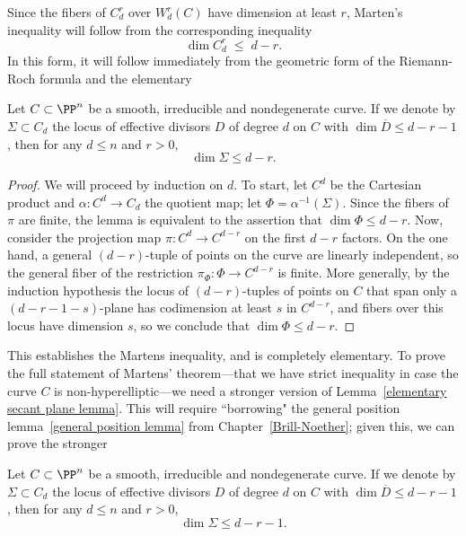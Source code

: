 Since the fibers of $C^r_d$ over $W^r_d(C)$ have dimension at least $r$, Marten's inequality will follow from the corresponding inequality
$$
\dim C^r_d \; \leq \; d-r.
$$
In this form, it will follow immediately from the geometric form of the Riemann-Roch formula and the elementary

\begin{lemma}\label{elementary secant plane lemma}
Let $C \subset \PP^n$ be a smooth, irreducible and nondegenerate curve. If we denote by $\Sigma \subset C_d$ the locus of effective divisors $D$ of degree $d$ on $C$ with $\dim \overline D \leq d-r-1$, then for any $d \leq n$ and $r > 0$,
$$
\dim \Sigma \leq d-r.
$$
\end{lemma}

\begin{proof}
We will proceed by induction on $d$. To start, let $C^d$ be the Cartesian product and $\alpha : C^d \to C_d$ the quotient map; let $\Phi = \alpha^{-1}(\Sigma)$. Since the fibers of $\pi$ are finite, the lemma is equivalent to the assertion that $\dim \Phi \leq d-r$. Now, consider the projection map $\pi : C^d \to C^{d-r}$ on the first $d-r$ factors. On the one hand, a general $(d-r)$-tuple of points on the curve are linearly independent, so the general fiber of the restriction $\pi_\Phi : \Phi \to C^{d-r}$ is finite. More generally, by the induction hypothesis the locus of $(d-r)$-tuples of points on $C$ that span only a $(d-r-1-s)$-plane has codimension at least $s$ in $C^{d-r}$, and fibers over this locus have dimension $s$, so we conclude that $\dim \Phi \leq d-r$.
\end{proof}

This establishes the Martens inequality, and is completely elementary. To prove the full statement of Martens' theorem---that we have strict inequality in case the curve $C$ is non-hyperelliptic---we need a stronger version of Lemma~\ref{elementary secant plane lemma}. This will require ``borrowing" the general position lemma~\ref{general position lemma} from Chapter~\ref{Brill-Noether}; given this, we can prove the stronger

\begin{lemma}\label{Strong secant plane lemma}
Let $C \subset \PP^n$ be a smooth, irreducible and nondegenerate curve. If we denote by $\Sigma \subset C_d$ the locus of effective divisors $D$ of degree $d$ on $C$ with $\dim \overline D \leq d-r-1$, then for any $d \leq n$ and $r > 0$,
$$
\dim \Sigma \leq d-r-1.
$$
\end{lemma}

